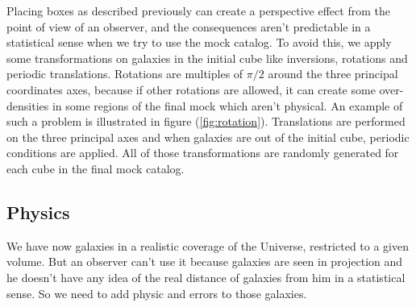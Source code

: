 Placing boxes as described previously can create a perspective effect from the
point of view of an observer, and the consequences aren't predictable in a
statistical sense when we try to use the mock catalog. To avoid this, we apply
some transformations on galaxies in the initial cube like inversions, rotations
and periodic translations. Rotations are multiples of $\pi/2$ around the three
principal coordinates axes, because if other rotations are allowed, it can
create some over-densities in some regions of the final mock which aren't
physical. An example of such a problem is illustrated in figure
(\ref{fig:rotation}). Translations are performed on the three principal axes
and when galaxies are out of the initial cube, periodic conditions are applied.
All of those transformations are randomly generated for each cube in the final
mock catalog.
%
\subsection{Physics}
%
We have now galaxies in a realistic coverage of the Universe, restricted to a
given volume. But an observer can't use it because galaxies are seen in
projection and he doesn't have any idea of the real distance of galaxies from
him in a statistical sense. So we need to add physic and errors to those
galaxies.
%
